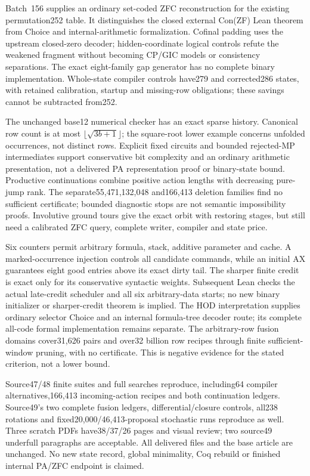\documentclass[11pt]{article}
\begin{document}
{Batch~156 supplies an ordinary set-coded ZFC reconstruction for the existing
permutation252 table. It distinguishes the closed external Con(ZF) Lean theorem
from Choice and internal-arithmetic formalization. Cofinal padding uses the
upstream closed-zero decoder; hidden-coordinate logical controls refute the
weakened fragment without becoming CP/GIC models or consistency separations.
The exact eight-family gap generator has no complete binary implementation.
Whole-state compiler controls have279 and corrected286 states, with retained
calibration, startup and missing-row obligations; these savings cannot be
subtracted from252.

The unchanged base12 numerical checker has an exact sparse history. Canonical
row count is at most $\lfloor\sqrt{3b+1}\rfloor$; the square-root lower example
concerns unfolded occurrences, not distinct rows. Explicit fixed circuits and
bounded rejected-MP intermediates support conservative bit complexity and an
ordinary arithmetic presentation, not a delivered PA representation proof or
binary-state bound. Productive continuations combine positive action lengths
with decreasing pure-jump rank. The separate55,471,132,048 and166,413 deletion
families find no sufficient certificate; bounded diagnostic stops are not
semantic impossibility proofs. Involutive ground tours give the exact orbit
with restoring stages, but still need a calibrated ZFC query, complete writer,
compiler and state price.

Six counters permit arbitrary formula, stack, additive parameter and cache.
A marked-occurrence injection controls all candidate commands, while an initial
AX guarantees eight good entries above its exact dirty tail. The sharper finite
credit is exact only for its conservative syntactic weights. Subsequent Lean
checks the actual late-credit scheduler and all six arbitrary-data starts;
no new binary initializer or sharper-credit theorem is implied. The HOD
interpretation supplies ordinary selector Choice and an internal formula-tree
decoder route; its complete all-code formal implementation remains separate.
The arbitrary-row fusion domains cover31,626 pairs and over32 billion row
recipes through finite sufficient-window pruning, with no certificate. This
is negative evidence for the stated criterion, not a lower bound.

Source47/48 finite suites and full searches reproduce, including64 compiler
alternatives,166,413 incoming-action recipes and both continuation ledgers.
Source49's two complete fusion ledgers, differential/closure controls, all238
rotations and fixed20,000/46,413-proposal stochastic runs reproduce as well.
Three scratch PDFs have38/37/26 pages and visual review; two source49 underfull
paragraphs are acceptable. All delivered files and the base article are unchanged.
No new state record, global minimality, Coq rebuild or finished internal PA/ZFC
endpoint is claimed.

}
\end{document}
